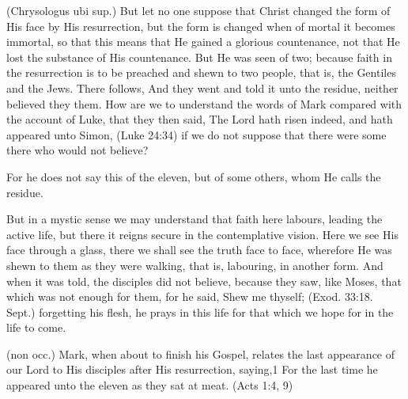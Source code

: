  (Chrysologus ubi sup.) But let no one suppose that Christ changed the form of His face by His resurrection, but the form is changed when of mortal it becomes immortal, so that this means that He gained a glorious countenance, not that He lost the substance of His countenance. But He was seen of two; because faith in the resurrection is to be preached and shewn to two people, that is, the Gentiles and the Jews. There follows, And they went and told it unto the residue, neither believed they them. How are we to understand the words of Mark compared with the account of Luke, that they then said, The Lord hath risen indeed, and hath appeared unto Simon, (Luke 24:34) if we do not suppose that there were some there who would not believe?

 For he does not say this of the eleven, but of some others, whom He calls the residue.

 But in a mystic sense we may understand that faith here labours, leading the active life, but there it reigns secure in the contemplative vision. Here we see His face through a glass, there we shall see the truth face to face, wherefore He was shewn to them as they were walking, that is, labouring, in another form. And when it was told, the disciples did not believe, because they saw, like Moses, that which was not enough for them, for he said, Shew me thyself; (Exod. 33:18. Sept.) forgetting his flesh, he prays in this life for that which we hope for in the life to come.

 

 (non occ.) Mark, when about to finish his Gospel, relates the last appearance of our Lord to His disciples after His resurrection, saying,1 For the last time he appeared unto the eleven as they sat at meat. (Acts 1:4, 9)

